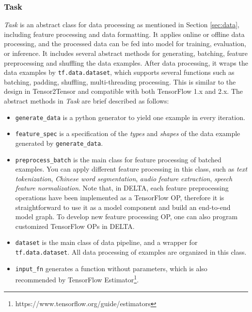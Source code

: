 \documentclass{article}
\begin{document}
\subsubsection{Task}

\textit{Task} is an abstract class for data processing as mentioned in Section \ref{sec:data}, including feature processing and data formatting. It applies online or offline data processing, and the processed data can be fed into model for training, evaluation, or inference. It includes several abstract methods for generating, batching, feature preprocessing and shuffling the data examples. After data processing, it wraps the data examples by \texttt{tf.data.dataset}, which supports several functions such as  batching, padding, shuffling, multi-threading processing. This is similar to the design in Tensor2Tensor \citep{tensor2tensor} and compatible with both TensorFlow 1.x and 2.x. The abstract methods in \textit{Task} are brief described as follows:

    \begin{itemize}
        \item \texttt{generate_data} is a python generator to yield one example in every iteration.

        \item \texttt{feature_spec} is a specification of the \textit{types} and \textit{shapes} of the data example generated by \texttt{generate_data}.

        \item \texttt{preprocess_batch} is the main class for feature processing of batched examples. You can apply different feature processing in this class, such as \textit{text tokenization}, \textit{Chinese word segmentation}, \textit{audio feature extraction}, \textit{speech feature normalization}. Note that, in DELTA, each feature preprocessing operations have been implemented as a TensorFlow OP, therefore it is straightforward to use it as a model component and build an end-to-end model graph. To develop new feature processing OP, one can also program customized TensorFlow OPs in DELTA.

        \item \texttt{dataset} is the main class of data pipeline, and a wrapper for \texttt{tf.data.dataset}. All data processing of examples are organized in this class.

        \item \texttt{input_fn} generates a function without parameters, which is also recommended by TensorFlow Estimator\footnote{https://www.tensorflow.org/guide/estimators}.
    \end{itemize}
\end{document}
